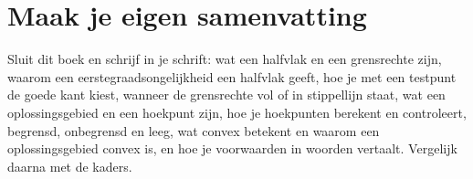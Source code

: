 
\begin{oefeningen}






\end{oefeningen}


\ifzelfstudie
\section*{Maak je eigen samenvatting}
Sluit dit boek en schrijf in je schrift: wat een halfvlak en een grensrechte zijn, waarom een eerstegraadsongelijkheid een halfvlak geeft, hoe je met een testpunt de goede kant kiest, wanneer de grensrechte vol of in stippellijn staat, wat een oplossingsgebied en een hoekpunt zijn, hoe je hoekpunten berekent en controleert, begrensd, onbegrensd en leeg, wat convex betekent en waarom een oplossingsgebied convex is, en hoe je voorwaarden in woorden vertaalt. Vergelijk daarna met de kaders.
\fi

